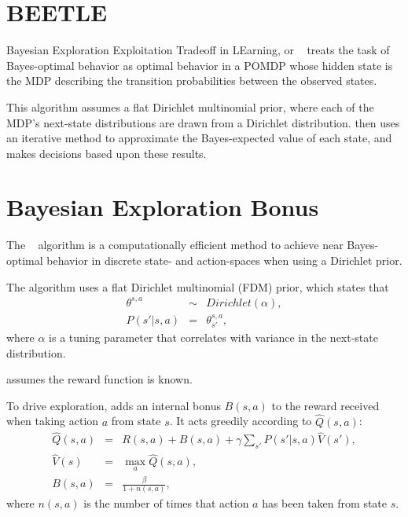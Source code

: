\section{BEETLE}

Bayesian Exploration Exploitation Tradeoff in LEarning, or ~\cite{poupart06} treats the task of Bayes-optimal behavior as optimal behavior in a POMDP whose hidden state is the MDP describing the transition probabilities between the observed states.

This algorithm assumes a flat Dirichlet multinomial prior, where each of the MDP's next-state distributions are drawn from a Dirichlet distribution.  then uses an iterative method  to approximate the Bayes-expected value of each state, and makes decisions based upon these results. 





\section{Bayesian Exploration Bonus}

The ~\cite{kolter09} algorithm is a computationally efficient method to achieve near Bayes-optimal behavior in discrete state- and action-spaces when using a Dirichlet prior.

The algorithm uses a flat Dirichlet multinomial (FDM) prior, which states that
\begin{eqnarray}
\theta^{s,a}&\sim&Dirichlet(\alpha),\\
P(s'|s,a)&=&\theta^{s,a}_{s'},
\end{eqnarray}
where $\alpha$ is a tuning parameter that correlates with variance in the next-state distribution.

 assumes the reward function is known.

To drive exploration,  adds an internal bonus $B(s,a)$ to the reward received when taking action $a$ from state $s$. It acts greedily according to $\hat Q(s,a)$:
\begin{eqnarray}
\hat Q(s,a)&=&R(s,a)+B(s,a)+\gamma \sum_{s'} P(s'|s,a)\hat V(s'),\\
\hat V(s)&=& \max_a \hat Q(s, a),\\
\label{eqn:rel:beb:bonus}
B(s,a)&=&\frac\beta{1+n(s,a)},
\end{eqnarray}
where $n(s,a)$ is the number of times that action $a$ has been taken from state $s$.

